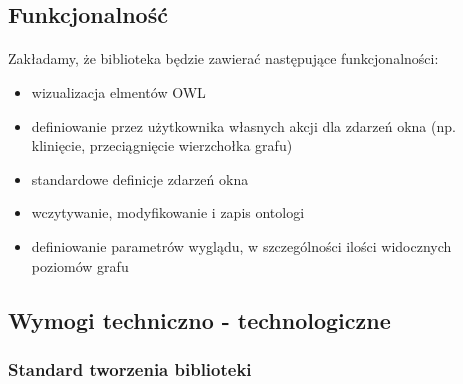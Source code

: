 \documentclass[a4paper,10pt]{article}
\begin{document}
\subsection{Funkcjonalność}
\paragraph{} Zakładamy, że biblioteka będzie zawierać następujące funkcjonalności:
\begin{itemize}
 	\item wizualizacja elmentów OWL
	\item definiowanie przez użytkownika własnych akcji dla zdarzeń okna (np. klinięcie, przeciągnięcie wierzchołka grafu)
	\item standardowe definicje zdarzeń okna
	\item wczytywanie, modyfikowanie i zapis ontologi
	\item definiowanie parametrów wyglądu, w szczególności ilości widocznych poziomów grafu
\end{itemize}



\subsection{Wymogi techniczno - technologiczne}
\subsubsection{Standard tworzenia biblioteki}
\end{document}
